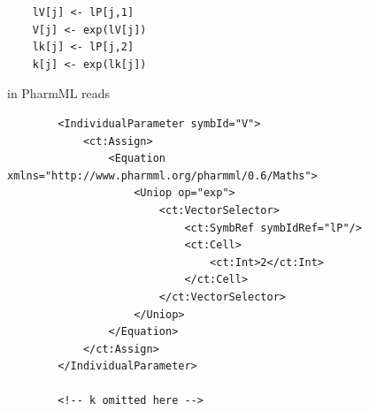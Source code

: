 \lstset{language=MLX}
\begin{lstlisting}
	lV[j] <- lP[j,1]
	V[j] <- exp(lV[j]) 
	lk[j] <- lP[j,2]
	k[j] <- exp(lk[j]) 
\end{lstlisting}
in PharmML reads
\lstset{language=XML}
\begin{lstlisting}
        <IndividualParameter symbId="V">
            <ct:Assign>
                <Equation xmlns="http://www.pharmml.org/pharmml/0.6/Maths">
                    <Uniop op="exp">
                        <ct:VectorSelector>
                            <ct:SymbRef symbIdRef="lP"/>
                            <ct:Cell>
                                <ct:Int>2</ct:Int>
                            </ct:Cell>
                        </ct:VectorSelector>
                    </Uniop>
                </Equation>
            </ct:Assign>
        </IndividualParameter>
        
        <!-- k omitted here -->
\end{lstlisting}

